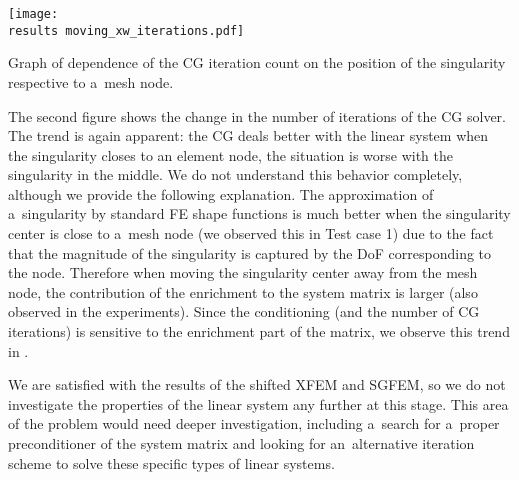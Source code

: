 \begin{graph}[!htb]
  \centering    
    \texttt{[image: \\results moving\_xw\_iterations.pdf]}
  \caption[CG iteration count dependence on singularity position.]{Graph of dependence of the CG iteration count
   on the position of the singularity respective to a~mesh node.}
  \label{graph:moving_xw_iterations}
\end{graph}
%
The second figure shows the change in the number of iterations of the CG solver. The trend is again apparent:
the CG deals better with the linear system when the singularity closes to an element node, the situation is worse
with the singularity in the middle. We do not understand this behavior completely, although we provide the following explanation.
The approximation of a~singularity by standard FE shape functions is much better when the singularity center is close to a~mesh node
(we observed this in Test case 1) due to the fact that the magnitude of the singularity is captured by the DoF corresponding to the node. 
Therefore when moving the singularity center away from the mesh node, the contribution of the enrichment to the system matrix is larger
(also observed in the experiments).
Since the conditioning (and the number of CG iterations) is sensitive to the enrichment part of the matrix,
we observe this trend in .


%         
%

We are satisfied with the results of the shifted XFEM and SGFEM, so we do not investigate the properties of the linear
system any further at this stage. This area of the problem would need deeper investigation, including a~search for a~proper
preconditioner of the system matrix and looking for an~alternative iteration scheme to solve these specific types of linear systems.



